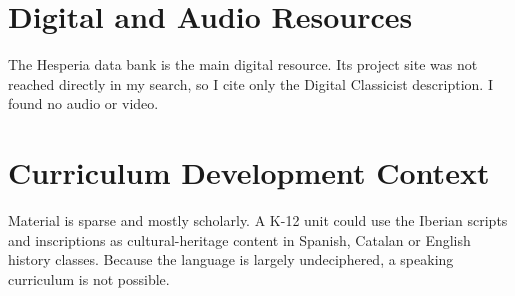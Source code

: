 \documentclass[12pt]{article}
\begin{document}
\section{Digital and Audio Resources}
The Hesperia data bank is the main digital resource. Its project site was not reached directly in my search, so I cite only the Digital Classicist description. I found no audio or video.

\section{Curriculum Development Context}
Material is sparse and mostly scholarly. A K-12 unit could use the Iberian scripts and inscriptions as cultural-heritage content in Spanish, Catalan or English history classes. Because the language is largely undeciphered, a speaking curriculum is not possible.
\end{document}

